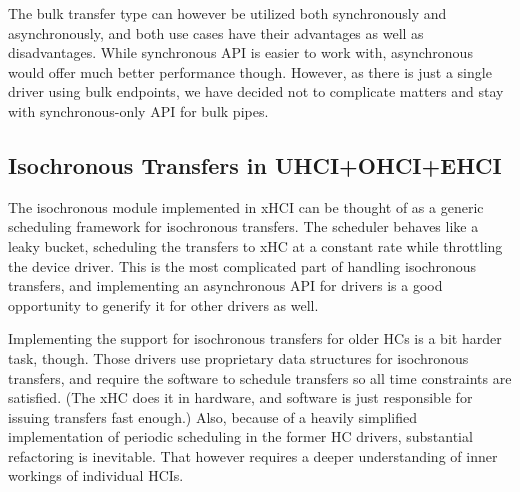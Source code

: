 The bulk transfer type can however be utilized both synchronously and
asynchronously, and both use cases have their advantages as well as disadvantages. While synchronous API is easier to
work with, asynchronous would offer much better performance though. However, as there is just
a single driver using bulk endpoints, we have decided not to complicate matters and stay
with synchronous-only API for bulk pipes.

\subsection{Isochronous Transfers in UHCI+OHCI+EHCI}

The isochronous module implemented in xHCI can be thought of as a generic scheduling
framework for isochronous transfers. The scheduler behaves like a leaky bucket,
scheduling the transfers to xHC at a constant rate while throttling the device
driver. This is the most complicated part of handling isochronous transfers,
and implementing an asynchronous API for drivers is a good opportunity to
generify it for other drivers as well.

Implementing the support for isochronous transfers for older HCs is a bit
harder task, though. Those drivers use proprietary data structures for isochronous
transfers, and require the software to schedule transfers so all time
constraints are satisfied. (The xHC does it in hardware, and software is just
responsible for issuing transfers fast enough.) Also, because of a heavily
simplified implementation of periodic scheduling in the former HC drivers,
substantial refactoring is inevitable. That however requires a deeper
understanding of inner workings of individual HCIs.
